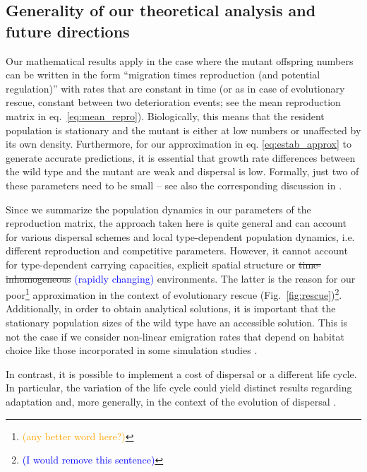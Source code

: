 \documentclass[11pt]{article}
\newcommand{\francois}[1]{\textcolor{blue}{(#1)}}
\newcommand{\pete}[1]{\textcolor{orange}{(#1)}}
\newcommand{\chg}[1]{\textcolor{change}{#1}}
\begin{document}
\subsection*{Generality of our theoretical analysis and future directions}
Our mathematical results apply in the case where the mutant offspring numbers can be written in the form ``migration times reproduction (and potential regulation)'' with rates that are constant in time (\chg{or as in case of evolutionary rescue, constant between two deterioration events}; see the mean reproduction matrix in eq.~\eqref{eq:mean_repro}). Biologically, this means that the resident population is stationary and the mutant is either at low numbers or unaffected by its own density. Furthermore, for our approximation in eq. \eqref{eq:estab_approx} to generate accurate predictions, it is essential that growth rate differences between the wild type and the mutant are weak and dispersal is low. Formally, just two of these parameters need to be small -- see also the corresponding discussion in \citet{tomasini_2018}. 

Since we summarize the population dynamics in our parameters of the reproduction matrix, the approach taken here is quite general and can account for various dispersal schemes and local \chg{type-dependent} population dynamics, \chg{i.e. different reproduction and competitive parameters.} However, it cannot account for \chg{type-dependent carrying capacities, explicit spatial structure %
or \st{time-inhomogeneous} \francois{rapidly changing} environments.}  The \chg{latter} is the reason for our \chg{poor}\footnote{\pete{any better word here?}} approximation in the context of evolutionary rescue (Fig.~\ref{fig:rescue})\footnote{\francois{I would remove this sentence}}. Additionally, in order to obtain analytical solutions, it is important that the stationary population sizes of the wild type have an accessible solution. This is not the case if we consider non-linear emigration rates that depend on habitat choice like those incorporated in some simulation studies \citep[e.g][]{holt_2015,mortier_2018}.  

In contrast, it \chg{is} possible to \chg{implement} a cost of dispersal \chg{or} a different life cycle. In particular, the variation of the life cycle could yield \chg{distinct} results regarding adaptation \citep{holt_2015} and, more generally, in the context of the evolution of dispersal \citep{massol_2015}. \\
\end{document}

